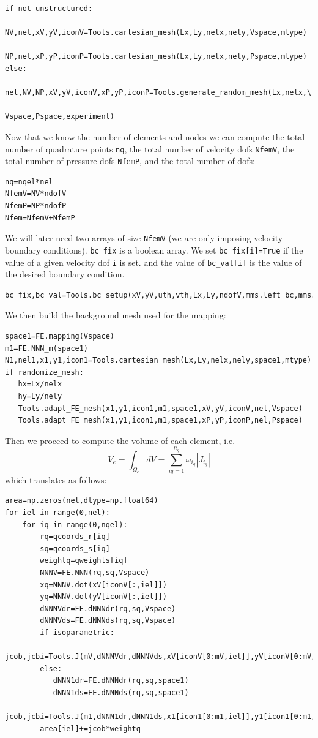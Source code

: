 \begin{lstlisting}
if not unstructured:
   NV,nel,xV,yV,iconV=Tools.cartesian_mesh(Lx,Ly,nelx,nely,Vspace,mtype)
   NP,nel,xP,yP,iconP=Tools.cartesian_mesh(Lx,Ly,nelx,nely,Pspace,mtype)
else:
   nel,NV,NP,xV,yV,iconV,xP,yP,iconP=Tools.generate_random_mesh(Lx,nelx,\
                                                 Vspace,Pspace,experiment)  
\end{lstlisting}

Now that we know the number of elements and nodes we can compute the 
total number of quadrature points \lstinline{nq}, 
the total number of velocity dofs \lstinline{NfemV}, 
the total number of pressure dofs \lstinline{NfemP}, 
and the total number of dofs:

\begin{lstlisting}
nq=nqel*nel
NfemV=NV*ndofV
NfemP=NP*ndofP
Nfem=NfemV+NfemP
\end{lstlisting}

We will later need two arrays of size \lstinline{NfemV} (we are only imposing
velocity boundary conditions). \lstinline{bc_fix} is a boolean array.
We set \lstinline{bc_fix[i]=True} if the value of a given velocity dof \lstinline{i} is set. 
and the value of \lstinline{bc_val[i]} is the value of the desired boundary condition.

\begin{lstlisting}
bc_fix,bc_val=Tools.bc_setup(xV,yV,uth,vth,Lx,Ly,ndofV,mms.left_bc,mms.right_bc,mms.bottom_bc,mms.top_bc)
\end{lstlisting}

We then build the background mesh used for the mapping:
\begin{lstlisting}
space1=FE.mapping(Vspace)
m1=FE.NNN_m(space1)
N1,nel1,x1,y1,icon1=Tools.cartesian_mesh(Lx,Ly,nelx,nely,space1,mtype)
if randomize_mesh:
   hx=Lx/nelx
   hy=Ly/nely
   Tools.adapt_FE_mesh(x1,y1,icon1,m1,space1,xV,yV,iconV,nel,Vspace)
   Tools.adapt_FE_mesh(x1,y1,icon1,m1,space1,xP,yP,iconP,nel,Pspace)
\end{lstlisting}




Then we proceed to compute the volume of each element, i.e. 
\[
V_e = \int_{\Omega_e} dV = \sum_{iq=1}^{n_q} \omega_{i_q} |J_{i_q}|
\]
which translates as follows: 
\begin{lstlisting}
area=np.zeros(nel,dtype=np.float64) 
for iel in range(0,nel):
    for iq in range(0,nqel):
        rq=qcoords_r[iq]
        sq=qcoords_s[iq]
        weightq=qweights[iq]
        NNNV=FE.NNN(rq,sq,Vspace)
        xq=NNNV.dot(xV[iconV[:,iel]]) 
        yq=NNNV.dot(yV[iconV[:,iel]]) 
        dNNNVdr=FE.dNNNdr(rq,sq,Vspace)
        dNNNVds=FE.dNNNds(rq,sq,Vspace)
        if isoparametric:
           jcob,jcbi=Tools.J(mV,dNNNVdr,dNNNVds,xV[iconV[0:mV,iel]],yV[iconV[0:mV,iel]])
        else:
           dNNN1dr=FE.dNNNdr(rq,sq,space1)
           dNNN1ds=FE.dNNNds(rq,sq,space1)
           jcob,jcbi=Tools.J(m1,dNNN1dr,dNNN1ds,x1[icon1[0:m1,iel]],y1[icon1[0:m1,iel]])
        area[iel]+=jcob*weightq
\end{lstlisting}



